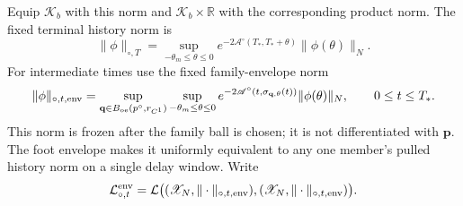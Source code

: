 \begin{lemma}
Equip \(\mathscr K_b\) with this norm and
\(\mathscr K_b\times\mathbb R\) with the corresponding product norm.
The fixed terminal history norm is
\begin{equation}
 \|\phi\|_{\circ,T}
 =\sup_{-\theta_m\le\theta\le0}
 e^{-2\mathscr A^\circ(T_*,T_*+\theta)}
       \|\phi(\theta)\|_N.                     \label{eq:oe-fixed-action-terminal-norm}
\end{equation}
For intermediate times use the fixed family-envelope norm
\begin{equation}
 \|\phi\|_{\circ,t,\rm env}
 =\sup_{\mathbf q\in B_{\rm oe}(p^\circ,r_{C^1})}
   \sup_{-\theta_m\le\theta\le0}
 e^{-2\mathscr A^\circ
       (t,\sigma_{\mathbf q,\theta}(t))}
       \|\phi(\theta)\|_N,\qquad0\le t\le T_* . \label{eq:oe-fixed-action-envelope-history-norm}
\end{equation}
This norm is frozen after the family ball is chosen; it is not
differentiated with \(\mathbf p\).  The foot envelope makes it uniformly
equivalent to any one member's pulled history norm on a single delay
window.
Write
\begin{equation}
 \mathcal L_{\circ,t}^{\rm env}
 =\mathcal L\bigl(
   (\mathscr X_N,\|\cdot\|_{\circ,t,\rm env}),
   (\mathscr X_N,\|\cdot\|_{\circ,t,\rm env})\bigr).
                                                        \label{eq:oe-fixed-action-envelope-operator-space}
\end{equation}


\end{lemma}
